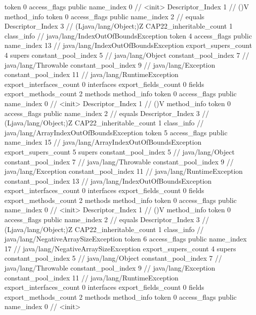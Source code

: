 {{{{{					token	0
					access_flags	public
					name_index	0		// <init>
					Descriptor_Index	1		// ()V
				}
				method_info {
					token	0
					access_flags	public
					name_index	2		// equals
					Descriptor_Index	3		// (Ljava/lang/Object;)Z
				}
			}
			CAP22_inheritable_count	1
		}
		class_info {		// java/lang/IndexOutOfBoundsException
			token	4
			access_flags	public
			name_index	13		// java/lang/IndexOutOfBoundsException
			export_supers_count	4
			supers {
				constant_pool_index	5		// java/lang/Object
				constant_pool_index	7		// java/lang/Throwable
				constant_pool_index	9		// java/lang/Exception
				constant_pool_index	11		// java/lang/RuntimeException
			}
			export_interfaces_count	0
			interfaces {
			}
			export_fields_count	0
			fields {
			}
			export_methods_count	2
			methods {
				method_info {
					token	0
					access_flags	public
					name_index	0		// <init>
					Descriptor_Index	1		// ()V
				}
				method_info {
					token	0
					access_flags	public
					name_index	2		// equals
					Descriptor_Index	3		// (Ljava/lang/Object;)Z
				}
			}
			CAP22_inheritable_count	1
		}
		class_info {		// java/lang/ArrayIndexOutOfBoundsException
			token	5
			access_flags	public
			name_index	15		// java/lang/ArrayIndexOutOfBoundsException
			export_supers_count	5
			supers {
				constant_pool_index	5		// java/lang/Object
				constant_pool_index	7		// java/lang/Throwable
				constant_pool_index	9		// java/lang/Exception
				constant_pool_index	11		// java/lang/RuntimeException
				constant_pool_index	13		// java/lang/IndexOutOfBoundsException
			}
			export_interfaces_count	0
			interfaces {
			}
			export_fields_count	0
			fields {
			}
			export_methods_count	2
			methods {
				method_info {
					token	0
					access_flags	public
					name_index	0		// <init>
					Descriptor_Index	1		// ()V
				}
				method_info {
					token	0
					access_flags	public
					name_index	2		// equals
					Descriptor_Index	3		// (Ljava/lang/Object;)Z
				}
			}
			CAP22_inheritable_count	1
		}
		class_info {		// java/lang/NegativeArraySizeException
			token	6
			access_flags	public
			name_index	17		// java/lang/NegativeArraySizeException
			export_supers_count	4
			supers {
				constant_pool_index	5		// java/lang/Object
				constant_pool_index	7		// java/lang/Throwable
				constant_pool_index	9		// java/lang/Exception
				constant_pool_index	11		// java/lang/RuntimeException
			}
			export_interfaces_count	0
			interfaces {
			}
			export_fields_count	0
			fields {
			}
			export_methods_count	2
			methods {
				method_info {
					token	0
					access_flags	public
					name_index	0		// <init>
}}}}}
